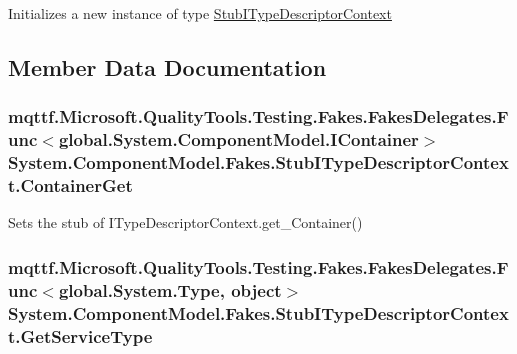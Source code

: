 Initializes a new instance of type \hyperlink{class_system_1_1_component_model_1_1_fakes_1_1_stub_i_type_descriptor_context}{Stub\-I\-Type\-Descriptor\-Context}



\subsection{Member Data Documentation}
\hypertarget{class_system_1_1_component_model_1_1_fakes_1_1_stub_i_type_descriptor_context_ab3baf1e5f8c8cb4ca335be2976aa835f}{
\subsubsection[{Container\-Get}]{\setlength{\rightskip}{0pt plus 5cm}mqttf.\-Microsoft.\-Quality\-Tools.\-Testing.\-Fakes.\-Fakes\-Delegates.\-Func$<$global.\-System.\-Component\-Model.\-I\-Container$>$ System.\-Component\-Model.\-Fakes.\-Stub\-I\-Type\-Descriptor\-Context.\-Container\-Get}}\label{class_system_1_1_component_model_1_1_fakes_1_1_stub_i_type_descriptor_context_ab3baf1e5f8c8cb4ca335be2976aa835f}


Sets the stub of I\-Type\-Descriptor\-Context.\-get\-\_\-\-Container()

\hypertarget{class_system_1_1_component_model_1_1_fakes_1_1_stub_i_type_descriptor_context_a0f90652f874769ebbfdc17c2c2a11f36}{
\subsubsection[{Get\-Service\-Type}]{\setlength{\rightskip}{0pt plus 5cm}mqttf.\-Microsoft.\-Quality\-Tools.\-Testing.\-Fakes.\-Fakes\-Delegates.\-Func$<$global.\-System.\-Type, object$>$ System.\-Component\-Model.\-Fakes.\-Stub\-I\-Type\-Descriptor\-Context.\-Get\-Service\-Type}}\label{class_system_1_1_component_model_1_1_fakes_1_1_stub_i_type_descriptor_context_a0f90652f874769ebbfdc17c2c2a11f36}



